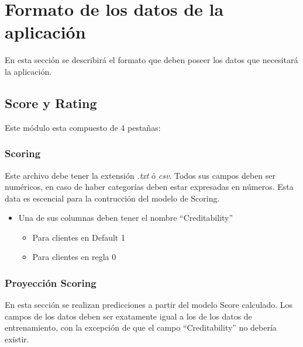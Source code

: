 \documentclass[
  12pt,
]{krantz}
\providecommand{\tightlist}{%
  \setlength{\itemsep}{0pt}\setlength{\parskip}{0pt}}
\theoremstyle{definition}
\theoremstyle{definition}
\theoremstyle{definition}
\theoremstyle{remark}
\begin{document}
\hypertarget{appendix-apendice}{%
\appendix {}}


\hypertarget{formato-de-los-datos-de-la-aplicacion}{%
\chapter{Formato de los datos de la aplicación}\label{formato-de-los-datos-de-la-aplicacion}}

En esta sección se describirá el formato que deben poseer los datos que necesitará la aplicación.

\hypertarget{score-y-rating-1}{%
\section{Score y Rating}\label{score-y-rating-1}}

Este módulo esta compuesto de 4 pestañas:

\hypertarget{scoring-1}{%
\subsection{Scoring}\label{scoring-1}}

Este archivo debe tener la extensión \emph{.txt} ó \emph{csv}. Todos sus campos deben ser numéricos, en caso de haber categorías deben estar expresadas en números. Esta data es escencial para la contrucción del modelo de Scoring.

\begin{itemize}
\tightlist
\item
  Una de sus columnas deben tener el nombre ``Creditability''

  \begin{itemize}
  \tightlist
  \item
    Para clientes en Default 1
  \item
    Para clientes en regla 0
  \end{itemize}
\end{itemize}

\hypertarget{proyeccion-scoring-1}{%
\subsection{Proyección Scoring}\label{proyeccion-scoring-1}}

En esta sección se realizan predicciones a partir del modelo Score calculado. Los campos de los datos deben ser exatamente igual a los de los datos de entrenamiento, con la excepción de que el campo ``Creditability'' no debería existir.
\end{document}
